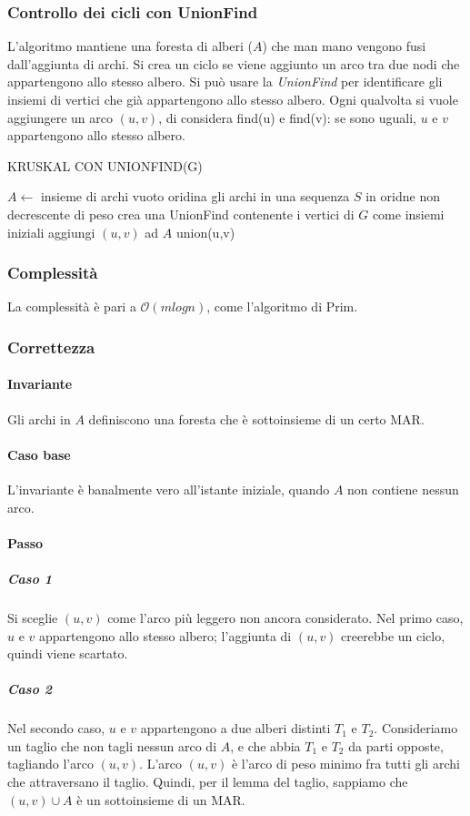 \documentclass[11pt]{book}
\begin{document}
\subsubsection{Controllo dei cicli con UnionFind}
L'algoritmo mantiene una foresta di alberi ($A$) che man mano vengono fusi dall'aggiunta di archi. Si crea un ciclo se 
viene aggiunto un arco tra due nodi che appartengono allo stesso albero. Si può usare la \textit{UnionFind} per identificare 
gli insiemi di vertici che già appartengono allo stesso albero. Ogni qualvolta si vuole aggiungere un arco $(u,v)$, di 
considera find(u) e find(v): se sono uguali, $u$ e $v$ appartengono allo stesso albero.
\begin{algorithm}
    \caption{KRUSKAL CON UNIONFIND(G)}
    \begin{algorithmic}
        \State $A\gets$ insieme di archi vuoto 
        \State oridina gli archi in una sequenza $S$ in oridne non decrescente di peso 
        \State crea una UnionFind contenente i vertici di $G$ come insiemi iniziali 
                \State aggiungi $(u,v)$ ad $A$
                \State union(u,v)
            \EndIf 
        \EndFor
    \end{algorithmic}
\end{algorithm}
\subsubsection{Complessità}
La complessità è pari a $\mathcal{O}(mlogn)$, come l'algoritmo di Prim.
\subsubsection{Correttezza}
\paragraph*{Invariante}
Gli archi in $A$ definiscono una foresta che è sottoinsieme di un certo MAR.
\paragraph*{Caso base}
L'invariante è banalmente vero all'istante iniziale, quando $A$ non contiene nessun arco.
\paragraph*{Passo}
\subparagraph*{Caso 1}
Si sceglie $(u,v)$ come l'arco più leggero non ancora considerato. Nel primo caso, $u$ e $v$ appartengono allo stesso 
albero; l'aggiunta di $(u,v)$ creerebbe un ciclo, quindi viene scartato.
\subparagraph*{Caso 2}
Nel secondo caso, $u$ e $v$ appartengono a due alberi distinti $T_1$ e $T_2$. Consideriamo un taglio che non tagli nessun 
arco di $A$, e che abbia $T_1$ e $T_2$ da parti opposte, tagliando l'arco $(u,v)$. L'arco $(u,v)$ è l'arco di peso minimo 
fra tutti gli archi che attraversano il taglio. Quindi, per il lemma del taglio, sappiamo che $(u,v)\cup A$ è un sottoinsieme 
di un MAR.
\end{document}

